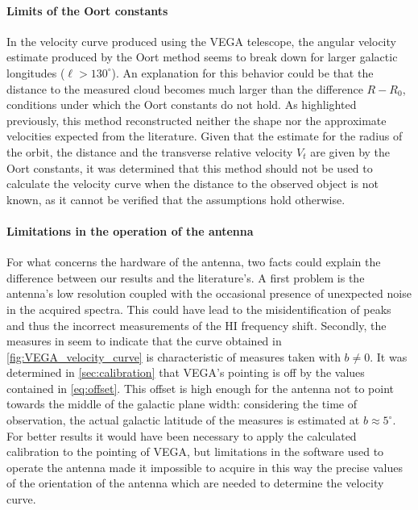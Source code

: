 \paragraph{Limits of the Oort constants}
In the velocity curve produced using the VEGA telescope, the angular velocity estimate produced by the Oort method seems to break down for larger galactic longitudes ($\ell > 130^\circ$). An explanation for this behavior could be that the distance to the measured cloud becomes much larger than the difference $R-R_0$, conditions under which the Oort constants do not hold.
As highlighted previously, this method reconstructed neither the shape nor the approximate velocities expected from the literature.
Given that the estimate for the radius of the orbit, the distance and the transverse relative velocity $V_t$ are given by the Oort constants, it was determined that this method should not be used to calculate the velocity curve when the distance to the observed object is not known, as it cannot be verified that the assumptions hold otherwise.

\paragraph{Limitations in the operation of the antenna}
For what concerns the hardware of the antenna, two facts could explain the difference between our results and the literature's. 
A first problem is the antenna's low resolution coupled with the occasional presence of unexpected noise in the acquired spectra. This could have lead to the misidentification of peaks and thus the incorrect measurements of the HI frequency shift. 
Secondly, the measures in \cite{sakhawat_hossain_salsa_2018} seem to indicate that the curve obtained in \autoref{fig:VEGA_velocity_curve} is characteristic of measures taken with $b \neq 0$. 
It was determined in \autoref{sec:calibration} that VEGA's pointing is off by the values contained in \autoref{eq:offset}.
This offset is high enough for the antenna not to point towards the middle of the galactic plane width: considering the time of observation, the actual galactic latitude of the measures is estimated at $b \approx 5^{\circ}$.
For better results it would have been necessary to apply the calculated calibration to the pointing of VEGA, but limitations in the software used to operate the antenna made it impossible to acquire in this way the precise values of the orientation of the antenna which are needed to determine the velocity curve.


